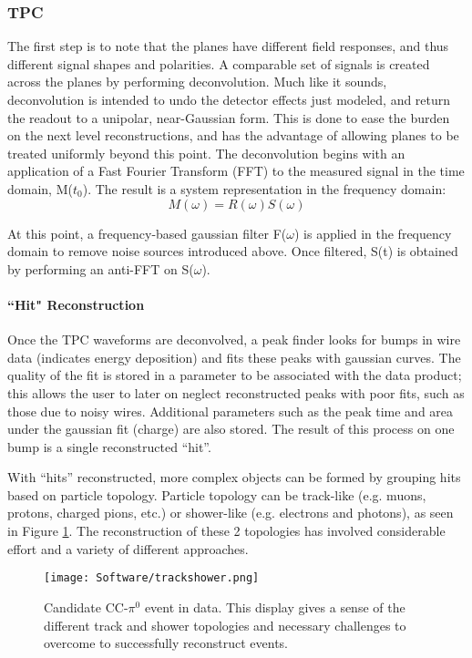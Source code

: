 \subsubsection{TPC}
 The first step is to note that the planes have different field responses, and thus different signal shapes and polarities.  A comparable set of signals is created across the planes by performing deconvolution.  Much like it sounds, deconvolution is intended to undo the detector effects just modeled, and return the readout to a unipolar, near-Gaussian form. This is done to ease the burden on the next level reconstructions, and has the advantage of allowing planes to be treated uniformly beyond this point. The deconvolution begins with an application of a Fast Fourier Transform (FFT) to the measured signal in the time domain, M($t_0$). The result is a system representation in the frequency domain:
\begin{equation}
M(\omega) = R(\omega)S(\omega) 
\end{equation}

\noindent At this point, a frequency-based gaussian filter F($\omega$) is applied in the frequency domain to remove noise sources introduced above. Once filtered, S(t) is obtained by performing an anti-FFT on S($\omega$). 

\paragraph{``Hit" Reconstruction}
 Once the TPC waveforms are deconvolved, a peak finder looks for bumps in wire data (indicates energy deposition) and fits these peaks with gaussian curves. The quality of the fit is stored in a parameter to be associated with the data product; this allows the user to later on neglect reconstructed peaks with poor fits, such as those due to noisy wires.  Additional parameters such as the peak time and area under the gaussian fit (charge) are also stored. The result of this process on one bump is a single reconstructed ``hit''. 

\par With ``hits'' reconstructed, more complex objects can be formed by grouping hits based on particle topology. Particle topology can be track-like (e.g. muons, protons, charged pions, etc.) or shower-like (e.g. electrons and photons), as seen in Figure \ref{fig:trackshower}. The reconstruction of these 2 topologies has involved considerable effort and a variety of different approaches.  
\begin{figure}[h!]
\centering
\texttt{[image: Software/trackshower.png]}
\caption{Candidate CC-$\pi^0$ event in data. This display gives a sense of the different track and shower topologies and necessary challenges to overcome to successfully reconstruct events.} 
\label{fig:trackshower}
\end{figure}

